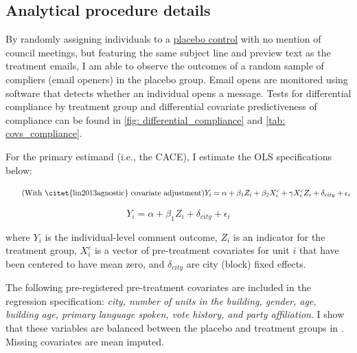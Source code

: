 \documentclass[12pt,final,fleqn]{article}
\theoremstyle{plain}
\begin{document}
\pagebreak
\subsection{Analytical procedure details} \label{sec: analytic_details}

By randomly assigning individuals to a \hyperref[subfig: placebo]{placebo control} with no mention of council meetings, but featuring the same subject line and preview text as the treatment emails, I am able to observe the outcomes of a random sample of compliers (email openers) in the placebo group. Email opens are monitored using software that detects whether an individual opens a message. Tests for differential compliance by treatment group and differential covariate predictiveness of compliance can be found in \autoref{fig: differential_compliance} and \autoref{tab: covs_compliance}.

For the primary estimand (i.e., the CACE), I estimate the OLS specifications below:

\vspace{-1cm}
\begin{equation}
  \tag{With \citet{lin2013agnostic} covariate adjustment}
  Y_i = \alpha + \beta_1Z_i + \beta_2 X_i^c + \gamma X_i^c Z_i + \delta_{city} +  \epsilon_i
  \label{eqn: cov}
\end{equation}

\vspace{-2cm}
\begin{equation}
  \tag{Without covariate adjustment}
  Y_i = \alpha + \beta_1Z_i + \delta_{city} + \epsilon_i
  \label{eqn: nocov}
\end{equation}

where  $Y_i$ is the individual-level comment outcome, $Z_i$ is an indicator for the treatment group, $X_i^c$  is a vector of pre-treatment covariates for unit $i$ that have been centered to have mean zero, and $\delta_{city}$ are city (block) fixed effects. 

The following pre-registered pre-treatment covariates are included in the regression specification: \textit{city, number of units in the building, gender, age, building age, primary language spoken, vote history, and party affiliation}. I show that these variables are balanced between the placebo and treatment groups in . Missing covariates are mean imputed.
\end{document}
